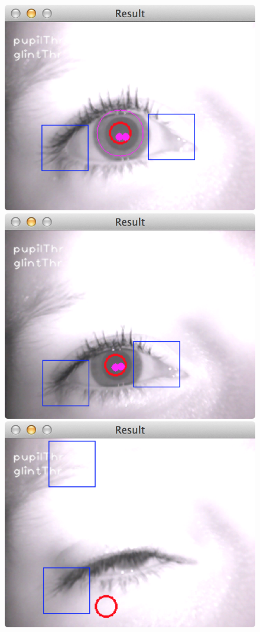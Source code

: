 \documentclass[a4paper,11pt]{article}
\begin{document}
\begin{figure}[H]
  \centering
  \includegraphics[scale=0.3]{resgood}
  \includegraphics[scale=0.3]{resnoiris}
  \includegraphics[scale=0.3]{resnotworking}

\end{figure}
\end{document}
